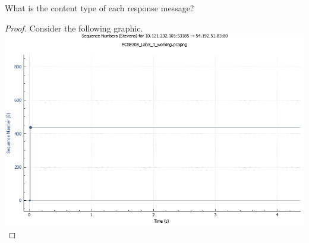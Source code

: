 \documentclass[../../main.tex]{subfiles}
\begin{document}
\begin{wts}
What is the content type of each response message?
\end{wts}
\begin{proof}
Consider the following graphic.\\
\includegraphics[width=\textwidth]{subfiles/images/ECSE_308_Lab_5_1_SUPA_PAGE5_18_Image53.png}



\end{proof}
\end{document}
